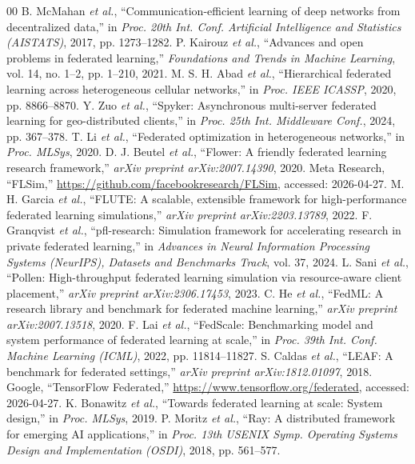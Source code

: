 \documentclass[conference]{IEEEtran}
\begin{document}
\begin{thebibliography}{00}
 B. McMahan \textit{et al.}, ``Communication-efficient learning of deep networks from decentralized data,'' in \textit{Proc. 20th Int. Conf. Artificial Intelligence and Statistics (AISTATS)}, 2017, pp. 1273--1282.
 P. Kairouz \textit{et al.}, ``Advances and open problems in federated learning,'' \textit{Foundations and Trends in Machine Learning}, vol. 14, no. 1--2, pp. 1--210, 2021.
 M. S. H. Abad \textit{et al.}, ``Hierarchical federated learning across heterogeneous cellular networks,'' in \textit{Proc. IEEE ICASSP}, 2020, pp. 8866--8870.
 Y. Zuo \textit{et al.}, ``Spyker: Asynchronous multi-server federated learning for geo-distributed clients,'' in \textit{Proc. 25th Int. Middleware Conf.}, 2024, pp. 367--378.
 T. Li \textit{et al.}, ``Federated optimization in heterogeneous networks,'' in \textit{Proc. MLSys}, 2020.
 D. J. Beutel \textit{et al.}, ``Flower: A friendly federated learning research framework,'' \textit{arXiv preprint arXiv:2007.14390}, 2020.
 Meta Research, ``FLSim,'' \url{https://github.com/facebookresearch/FLSim}, accessed: 2026-04-27.
 M. H. Garcia \textit{et al.}, ``FLUTE: A scalable, extensible framework for high-performance federated learning simulations,'' \textit{arXiv preprint arXiv:2203.13789}, 2022.
 F. Granqvist \textit{et al.}, ``pfl-research: Simulation framework for accelerating research in private federated learning,'' in \textit{Advances in Neural Information Processing Systems (NeurIPS), Datasets and Benchmarks Track}, vol. 37, 2024.
 L. Sani \textit{et al.}, ``Pollen: High-throughput federated learning simulation via resource-aware client placement,'' \textit{arXiv preprint arXiv:2306.17453}, 2023.
 C. He \textit{et al.}, ``FedML: A research library and benchmark for federated machine learning,'' \textit{arXiv preprint arXiv:2007.13518}, 2020.
 F. Lai \textit{et al.}, ``FedScale: Benchmarking model and system performance of federated learning at scale,'' in \textit{Proc. 39th Int. Conf. Machine Learning (ICML)}, 2022, pp. 11814--11827.
 S. Caldas \textit{et al.}, ``LEAF: A benchmark for federated settings,'' \textit{arXiv preprint arXiv:1812.01097}, 2018.
 Google, ``TensorFlow Federated,'' \url{https://www.tensorflow.org/federated}, accessed: 2026-04-27.
 K. Bonawitz \textit{et al.}, ``Towards federated learning at scale: System design,'' in \textit{Proc. MLSys}, 2019.
 P. Moritz \textit{et al.}, ``Ray: A distributed framework for emerging {AI} applications,'' in \textit{Proc. 13th USENIX Symp. Operating Systems Design and Implementation (OSDI)}, 2018, pp. 561--577.
\end{thebibliography}
\end{document}
